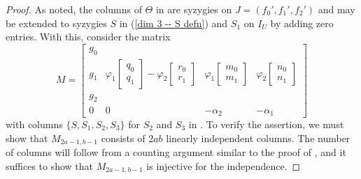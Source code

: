 \documentclass[reqno]{amsart}
\numberwithin{equation}{section}
\theoremstyle{definition}
\def\m{\mathfrak{m}}
\begin{document}
\begin{proof}
As noted, the columns of $\Theta$ in  are syzygies on $J=(f_0',f_1',f_2')$ and may be extended to syzygies $S$ in (\ref{dim 3 -- S defn}) and $S_1$ on $I_U$ by adding zero entries. With this, consider the matrix
\[
M=\left[
\begin{array}{c|c|c|c}
g_0 & & & \\
g_1&  \varphi_1\begin{bmatrix}
     q_0\\
     q_1
 \end{bmatrix} - \varphi_2\begin{bmatrix}
     r_0\\
     r_1
 \end{bmatrix} & \varphi_1\begin{bmatrix}
         m_0\\m_1
     \end{bmatrix}  & \varphi_2\begin{bmatrix}
         n_0\\n_1
     \end{bmatrix}  \\
 g_2 & & & \\[1ex]    
      \hline
 0&  0&  -\alpha_2 & -\alpha_1
\end{array}
\right]
\]
with columns $\{S,S_1,S_2,S_3\}$ for $S_2$ and $S_3$ in . To verify the assertion, we must show that $M_{2a-1,b-1}$ consists of $2ab$ linearly independent columns. The number of columns will follow from a counting argument similar to the proof of , and it suffices to show that $M_{2a-1,b-1}$ is injective for the independence. 




\end{proof}
\end{document}
